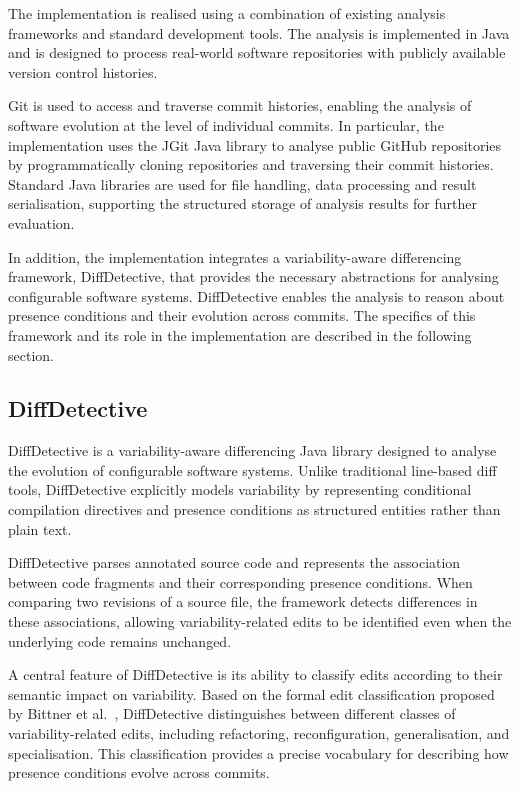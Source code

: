 The implementation is realised using a combination of existing analysis frameworks and standard development tools. The analysis is implemented in Java and is designed to process real-world software repositories with publicly available version control histories.

Git is used to access and traverse commit histories, enabling the analysis of software evolution at the level of individual commits. In particular, the implementation uses the JGit Java library to analyse public GitHub repositories by programmatically cloning repositories and traversing their commit histories. Standard Java libraries are used for file handling, data processing and result serialisation, supporting the structured storage of analysis results for further evaluation.

In addition, the implementation integrates a variability-aware differencing framework, DiffDetective, that provides the necessary abstractions for analysing configurable software systems. DiffDetective enables the analysis to reason about presence conditions and their evolution across commits. The specifics of this framework and its role in the implementation are described in the following section.

\subsection{DiffDetective}
DiffDetective is a variability-aware differencing Java library designed to analyse the evolution of configurable software systems. Unlike traditional line-based diff tools, DiffDetective explicitly models variability by representing conditional compilation directives and presence conditions as structured entities rather than plain text.

DiffDetective parses annotated source code and represents the association between code fragments and their corresponding presence conditions. When comparing two revisions of a source file, the framework detects differences in these associations, allowing variability-related edits to be identified even when the underlying code remains unchanged.

A central feature of DiffDetective is its ability to classify edits according to their semantic impact on variability. Based on the formal edit classification proposed by Bittner et al.~\cite{Bittner2022_edits}, DiffDetective distinguishes between different classes of variability-related edits, including refactoring, reconfiguration, generalisation, and specialisation. This classification provides a precise vocabulary for describing how presence conditions evolve across commits.

